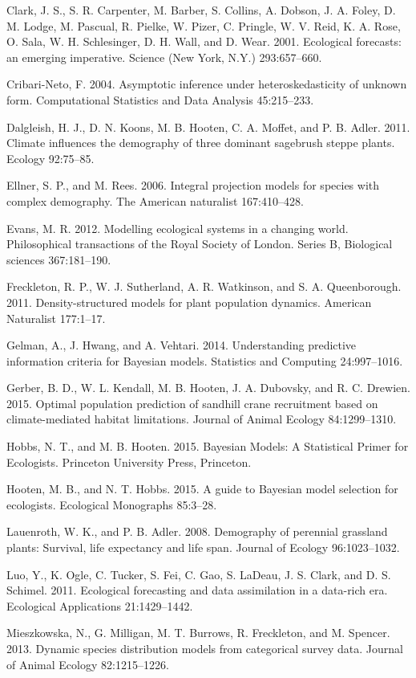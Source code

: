 \documentclass[12pt,]{article}
\begin{document}
Clark, J. S., S. R. Carpenter, M. Barber, S. Collins, A. Dobson, J. A.
Foley, D. M. Lodge, M. Pascual, R. Pielke, W. Pizer, C. Pringle, W. V.
Reid, K. A. Rose, O. Sala, W. H. Schlesinger, D. H. Wall, and D. Wear.
2001. Ecological forecasts: an emerging imperative. Science (New York,
N.Y.) 293:657--660.

Cribari-Neto, F. 2004. Asymptotic inference under heteroskedasticity of
unknown form. Computational Statistics and Data Analysis 45:215--233.

Dalgleish, H. J., D. N. Koons, M. B. Hooten, C. A. Moffet, and P. B.
Adler. 2011. Climate influences the demography of three dominant
sagebrush steppe plants. Ecology 92:75--85.

Ellner, S. P., and M. Rees. 2006. Integral projection models for species
with complex demography. The American naturalist 167:410--428.

Evans, M. R. 2012. Modelling ecological systems in a changing world.
Philosophical transactions of the Royal Society of London. Series B,
Biological sciences 367:181--190.

Freckleton, R. P., W. J. Sutherland, A. R. Watkinson, and S. A.
Queenborough. 2011. Density-structured models for plant population
dynamics. American Naturalist 177:1--17.

Gelman, A., J. Hwang, and A. Vehtari. 2014. Understanding predictive
information criteria for Bayesian models. Statistics and Computing
24:997--1016.

Gerber, B. D., W. L. Kendall, M. B. Hooten, J. A. Dubovsky, and R. C.
Drewien. 2015. Optimal population prediction of sandhill crane
recruitment based on climate-mediated habitat limitations. Journal of
Animal Ecology 84:1299--1310.

Hobbs, N. T., and M. B. Hooten. 2015. Bayesian Models: A Statistical
Primer for Ecologists. Princeton University Press, Princeton.

Hooten, M. B., and N. T. Hobbs. 2015. A guide to Bayesian model
selection for ecologists. Ecological Monographs 85:3--28.

Lauenroth, W. K., and P. B. Adler. 2008. Demography of perennial
grassland plants: Survival, life expectancy and life span. Journal of
Ecology 96:1023--1032.

Luo, Y., K. Ogle, C. Tucker, S. Fei, C. Gao, S. LaDeau, J. S. Clark, and
D. S. Schimel. 2011. Ecological forecasting and data assimilation in a
data-rich era. Ecological Applications 21:1429--1442.

Mieszkowska, N., G. Milligan, M. T. Burrows, R. Freckleton, and M.
Spencer. 2013. Dynamic species distribution models from categorical
survey data. Journal of Animal Ecology 82:1215--1226.
\end{document}
